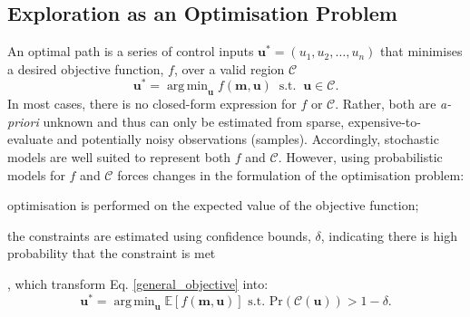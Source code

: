 \documentclass[shortAfour,sageh,times]{sagej_no_sage}
\newcommand{\vect}[1]{(#1_1,#1_2,\dots,#1_n)}
\DeclareMathOperator*{\argmin}{arg\,min}
\begin{document}
\subsection{Exploration as an Optimisation Problem}
An optimal path is a series of control inputs $\boldsymbol{u^*}=\vect{u}$ that minimises a desired objective function, $f$, over a valid region $\mathcal{C}$ 
\begin{equation}\label{general_objective}
   \boldsymbol{u^*}=\argmin_{\boldsymbol{u}} f(\boldsymbol{m},\boldsymbol{u}) ~\text{ s.t. } ~\boldsymbol{u} \in \mathcal{C}.
\end{equation}
In most cases, there is no closed-form expression for $f$ or $\mathcal{C}$. Rather, both are \textit{a-priori} unknown and thus can only be estimated from sparse, expensive-to-evaluate and potentially noisy observations (samples). Accordingly, stochastic models are well suited to represent both $f$ and $\mathcal{C}$. However, using probabilistic models for $f$ and $\mathcal{C}$ forces changes in the formulation of the optimisation problem:
\begin{inparaenum}[(i)]  
\item optimisation is performed on  the expected value of the objective function; 
\item  the constraints are estimated using confidence bounds, $\delta$, indicating there is high probability that the constraint is met
\end{inparaenum} \citep{Brochu2010} , which transform Eq. \ref{general_objective} into:
\begin{equation}\label{general_objective_in_expectation}
      	\boldsymbol{u^*}=\argmin_{\boldsymbol{u}} \mathbb{E}[f(\boldsymbol{m},\boldsymbol{u})] \text{ s.t. } \mathrm{Pr}(\mathcal{C}(\boldsymbol{u})) > 1-\delta.
\end{equation}
\end{document}
